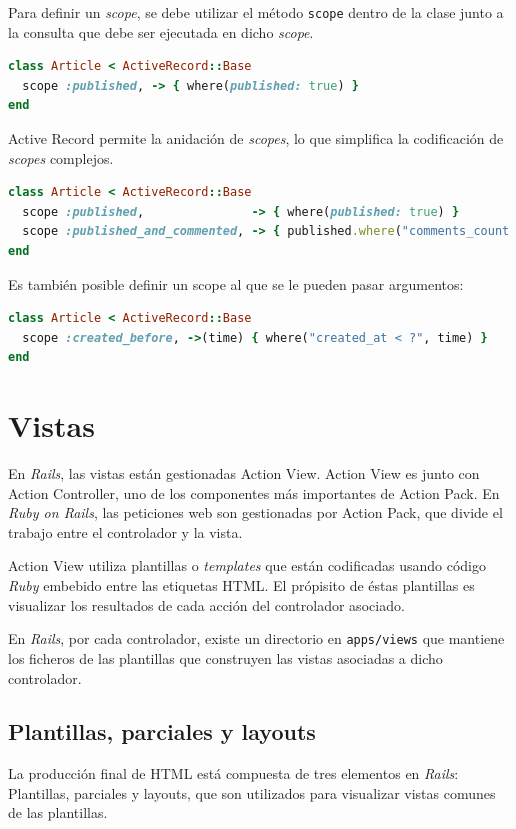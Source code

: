 Para definir un \textit{scope}, se debe utilizar el método \texttt{scope} dentro de la clase junto a la consulta que debe ser ejecutada en dicho \textit{scope}.

\begin{lstlisting}[language=Ruby]
class Article < ActiveRecord::Base
  scope :published, -> { where(published: true) }
end
\end{lstlisting}

Active Record permite la anidación de \textit{scopes}, lo que simplifica la codificación de \textit{scopes} complejos.

\begin{lstlisting}[language=Ruby]
class Article < ActiveRecord::Base
  scope :published,               -> { where(published: true) }
  scope :published_and_commented, -> { published.where("comments_count > 0") }
end
\end{lstlisting}

Es también posible definir un scope al que se le pueden pasar argumentos:

\begin{lstlisting}[language=Ruby]
class Article < ActiveRecord::Base
  scope :created_before, ->(time) { where("created_at < ?", time) }
end
\end{lstlisting}



\section{Vistas}
En \textit{Rails}, las vistas están gestionadas Action View. Action View es junto con Action Controller, uno de los componentes más importantes de Action Pack. En \textit{Ruby on Rails}, las peticiones web son gestionadas por Action Pack, que divide el trabajo entre el controlador y la vista.

Action View utiliza plantillas o \textit{templates} que están codificadas usando código \textit{Ruby} embebido entre las etiquetas HTML. El própisito de éstas plantillas es visualizar los resultados de cada acción del controlador asociado.

En \textit{Rails}, por cada controlador, existe un directorio en \texttt{apps/views} que mantiene los ficheros de las plantillas que construyen las vistas asociadas a dicho controlador.

\subsection{Plantillas, parciales y layouts}
La producción final de HTML está compuesta de tres elementos en \textit{Rails}: Plantillas, parciales y layouts, que son utilizados para visualizar vistas comunes de las plantillas.

